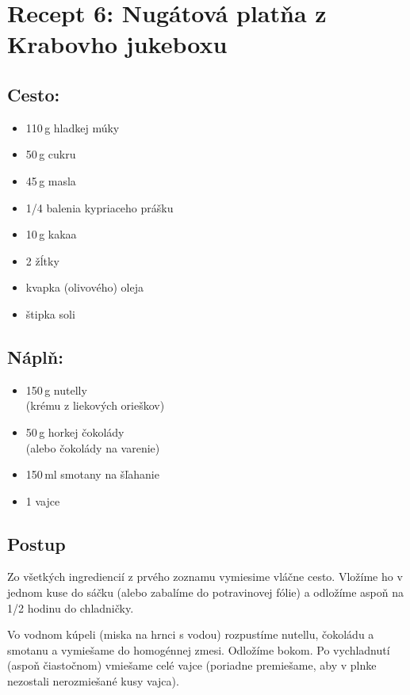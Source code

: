 \documentclass[12pt]{article}
\begin{document}
\section*{Recept 6: Nugátová platňa z Krabovho jukeboxu}
\bigskip
\begin{minipage}[t]{0.49\textwidth}
\subsection*{Cesto:}
\begin{itemize}[itemsep=0pt]
\item 110\,g hladkej múky
\item 50\,g cukru
\item 45\,g masla
\item 1/4 balenia kypriaceho prášku
\item 10\,g kakaa
\item 2 žĺtky
\item kvapka (olivového) oleja
\item štipka soli
\end{itemize}
\end{minipage}
\begin{minipage}[t]{0.5\textwidth}
\subsection*{Náplň:}
\begin{itemize}[itemsep=0pt]
\item 150\,g nutelly \\(krému z liekových orieškov)
\item 50\,g horkej čokolády \\(alebo čokolády na varenie)
\item 150\,ml smotany na šľahanie
\item 1 vajce
\end{itemize}
\end{minipage}
\subsection*{Postup}
\setlength{\parskip}{0.5em}
Zo všetkých ingrediencií z prvého zoznamu vymiesime vláčne cesto. Vložíme ho v jednom kuse do sáčku (alebo zabalíme do potravinovej fólie) a odložíme aspoň na 1/2 hodinu do chladničky. 

Vo vodnom kúpeli (miska na hrnci s vodou) rozpustíme nutellu, čokoládu a smotanu a vymiešame do homogénnej zmesi. Odložíme bokom. Po vychladnutí (aspoň čiastočnom) vmiešame celé vajce (poriadne premiešame, aby v plnke nezostali nerozmiešané kusy vajca).
\end{document}
